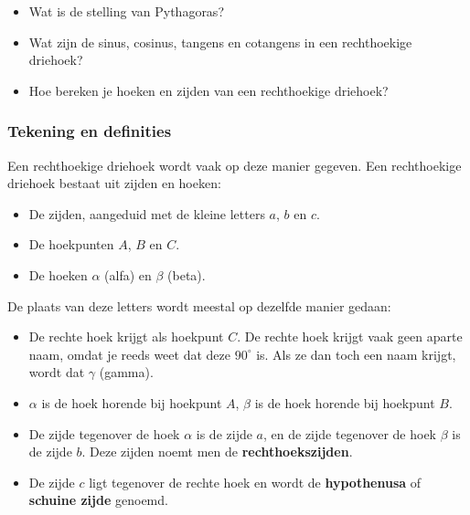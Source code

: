 \begin{itemize}
	\item Wat is de stelling van Pythagoras?
	\item Wat zijn de sinus, cosinus, tangens en cotangens in een rechthoekige driehoek?
	\item Hoe bereken je hoeken en zijden van een rechthoekige driehoek?
\end{itemize}

\subsubsection{Tekening en definities}



Een rechthoekige driehoek wordt vaak op deze manier gegeven. Een rechthoekige driehoek bestaat uit zijden en hoeken:
\begin{itemize}
	\item De zijden, aangeduid met de kleine letters $a$, $b$ en $c$.
	\item De hoekpunten $A$, $B$ en $C$.
	\item De hoeken $\alpha$ (alfa) en $\beta$ (beta).
\end{itemize}

De plaats van deze letters wordt meestal op dezelfde manier gedaan:
\begin{itemize}
	\item De rechte hoek krijgt als hoekpunt $C$. De rechte hoek krijgt vaak geen aparte naam, omdat je reeds weet dat deze $90^\circ$ is. Als ze dan toch een naam krijgt, wordt dat $\gamma$ (gamma).
	\item $\alpha$ is de hoek horende bij hoekpunt $A$, $\beta$ is de hoek horende bij hoekpunt $B$.
	\item De zijde tegenover de hoek $\alpha$ is de zijde $a$, en de zijde tegenover de hoek $\beta$ is de zijde $b$. Deze zijden noemt men de \textbf{rechthoekszijden}.
	\item De zijde $c$ ligt tegenover de rechte hoek en wordt de \textbf{hypothenusa} of \textbf{schuine zijde} genoemd.
\end{itemize}

